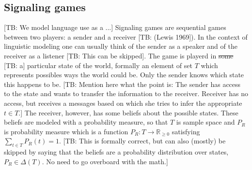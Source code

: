 \documentclass[10pt]{article}
\newcommand{\tb}[1]{\textcolor[rgb]{.8,.33,.0}{[TB: #1]}}%
\begin{document}
\subsection{Signaling games}
\tb{We model language use as a ...} Signaling games are sequential games between two players: a sender and a receiver \tb{(Lewis 1969}). In the context of linguistic modeling one can usually think of the sender as a speaker and of the receiver as a listener \tb{This can be skipped}. The game is playerd in \sout{some} \tb{a} particular state of the world, formally an element of set $T$ which represents possibles ways the world could be. Only the sender knows which state this happens to be. \tb{Mention here what the point is: The sender has access to the state and wants to transfer the information to the receiver. Receiver has no access, but receives a messages based on which she tries to infer the appropriate $t \in T$.} The receiver, however, has some beliefs about the possible states. These beliefs are modeled with a probability measure, so that $T$ is sample space and $P_R$ is probability measure which is a function $P_R: T\rightarrow \mathbb{R}_{\geq 0}$ satisfying $\sum_{t\in T}P_R(t)=1$. \tb{This is formally correct, but can also (mostly) be skipped by saying that the beliefs are a probability distribution over states, $P_R \in \Delta(T)$. No need to go overboard with the math.}
\end{document}
